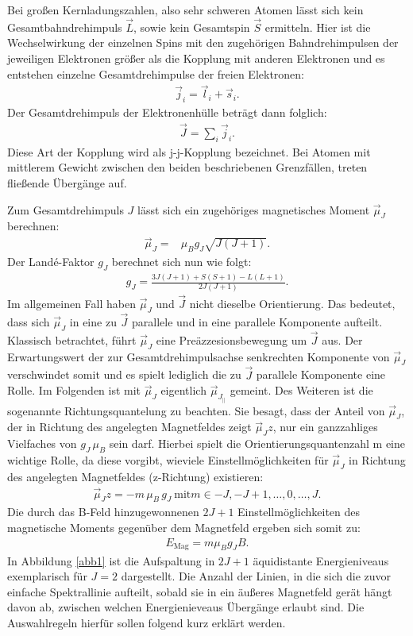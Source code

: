 \noindent Bei großen Kernladungszahlen, also sehr schweren Atomen lässt sich kein Gesamtbahndrehimpuls $\vec{L}$,
sowie kein Gesamtspin $\vec{S}$ ermitteln. Hier ist die Wechselwirkung der einzelnen Spins mit den zugehörigen
Bahndrehimpulsen der jeweiligen Elektronen größer als die Kopplung mit anderen Elektronen und es
entstehen einzelne Gesamtdrehimpulse der freien Elektronen:
\begin{align*}
    \vec{j}_i = \vec{l}_i + \vec{s}_i.
\end{align*}
Der Gesamtdrehimpuls der Elektronenhülle beträgt dann folglich:
\begin{align*}
    \vec{J} = \sum_i \vec{j}_i.
\end{align*}
Diese Art der Kopplung wird als j-j-Kopplung bezeichnet.
Bei Atomen mit mittlerem Gewicht zwischen den beiden beschriebenen Grenzfällen, treten fließende Übergänge auf.

\noindent Zum Gesamtdrehimpuls $J$ lässt sich ein zugehöriges magnetisches Moment
$\vec{\mu}_J$ berechnen:
\begin{align*}
    \vec{\mu}_J =& \mu_B g_J \sqrt{J(J+1)}.
\end{align*}
Der Landé-Faktor $g_J$ berechnet sich nun wie folgt:
\begin{align*}
    g_J = \frac{3J(J+1) + S(S+1) - L(L+1)}{2J(J+1)}.
\end{align*}
Im allgemeinen Fall haben $\vec{\mu}_J$ und $\vec{J}$ nicht dieselbe Orientierung. Das bedeutet, dass
sich $\vec{\mu}_J$ in eine zu $\vec{J}$ parallele und in eine parallele Komponente aufteilt. Klassisch
betrachtet, führt $\vec{\mu}_J$ eine Preäzzesionsbewegung um $\vec{J}$ aus. Der Erwartungswert der zur Gesamtdrehimpulsachse
senkrechten Komponente von $\vec{\mu}_J$ verschwindet somit und es spielt lediglich die zu $\vec{J}$ parallele
Komponente eine Rolle. Im Folgenden ist mit $\vec{\mu}_J$ eigentlich $\vec{\mu}_J_||$ gemeint.
Des Weiteren ist die sogenannte Richtungsquantelung zu beachten. Sie besagt, dass der Anteil von $\vec{\mu}_J$, der in Richtung
des angelegten Magnetfeldes zeigt $\vec{\mu}_Jz$, nur ein ganzzahliges Vielfaches von $g_J \, \mu_B$ sein darf.
Hierbei spielt die Orientierungsquantenzahl m eine wichtige Rolle, da diese vorgibt, wieviele Einstellmöglichkeiten
für $\vec{\mu}_J$ in Richtung des angelegten Magnetfeldes (z-Richtung) existieren:
\begin{align*}
    \vec{\mu}_Jz = - m \, \mu_B \, g_J \ \text{mit} m \in {-J, -J+1, \dots,0, \dots, J}.
\end{align*}
Die durch das B-Feld hinzugewonnenen $2J+1$ Einstellmöglichkeiten des magnetische Moments gegenüber
dem Magnetfeld ergeben sich somit zu:
\begin{align*}
    E_{\text{Mag}} = m \mu_B g_J B.
\end{align*}
In Abbildung \ref{abb1} ist die Aufspaltung in $2J+1$ äquidistante Energieniveaus exemplarisch für $J=2$
dargestellt.
Die Anzahl der Linien, in die sich die zuvor einfache Spektrallinie aufteilt, sobald
sie in ein äußeres Magnetfeld gerät hängt davon ab, zwischen welchen Energienieveaus
Übergänge erlaubt sind. Die Auswahlregeln hierfür sollen folgend kurz erklärt werden.

